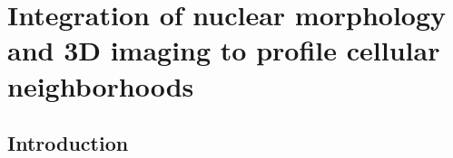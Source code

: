\chapter{Integration of nuclear morphology and 3D imaging to profile cellular neighborhoods} \label{chap:chap-7}

\begin{refsection}
    \section{Introduction}


    
    \clearpage
    \printbibliography[heading=subbibliography, title={References}]
\end{refsection}